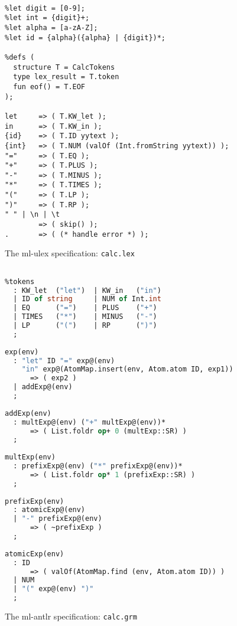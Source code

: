 \begin{figure}

\begin{lstlisting}[language=MLULex]
%name CalcLexer;

%let digit = [0-9];
%let int = {digit}+;
%let alpha = [a-zA-Z];
%let id = {alpha}({alpha} | {digit})*;

%defs (
  structure T = CalcTokens
  type lex_result = T.token
  fun eof() = T.EOF
);

let     => ( T.KW_let );
in      => ( T.KW_in );
{id}    => ( T.ID yytext );
{int}   => ( T.NUM (valOf (Int.fromString yytext)) );
"="     => ( T.EQ );
"+"     => ( T.PLUS );
"-"     => ( T.MINUS );
"*"     => ( T.TIMES );
"("     => ( T.LP );
")"     => ( T.RP );
" " | \n | \t
        => ( skip() );
.       => ( (* handle error *) );
\end{lstlisting}
\caption{The ml-ulex specification: \texttt{calc.lex}}
\label{fig:calc-lex}
\end{figure}%

\begin{figure}[p]
\begin{lstlisting}[language=SML]
%name Calc;

%tokens
  : KW_let  ("let")  | KW_in   ("in")
  | ID of string     | NUM of Int.int
  | EQ      ("=")    | PLUS    ("+")
  | TIMES   ("*")    | MINUS   ("-")
  | LP      ("(")    | RP      (")")
  ;
  
exp(env)
  : "let" ID "=" exp@(env) 
    "in" exp@(AtomMap.insert(env, Atom.atom ID, exp1))
      => ( exp2 )
  | addExp@(env)
  ;
  
addExp(env)
  : multExp@(env) ("+" multExp@(env))*
      => ( List.foldr op+ 0 (multExp::SR) )
  ;
  
multExp(env)
  : prefixExp@(env) ("*" prefixExp@(env))*
      => ( List.foldr op* 1 (prefixExp::SR) )
  ;
  
prefixExp(env)
  : atomicExp@(env)
  | "-" prefixExp@(env)
      => ( ~prefixExp )
  ;
  
atomicExp(env)
  : ID  
      => ( valOf(AtomMap.find (env, Atom.atom ID)) )
  | NUM
  | "(" exp@(env) ")"
  ;
\end{lstlisting}
\caption{The ml-antlr specification: \texttt{calc.grm}}
\label{fig:calc-grm}
\end{figure}%

